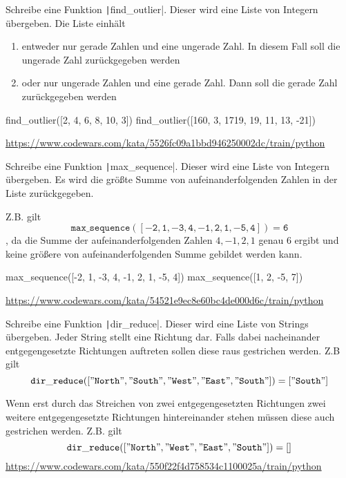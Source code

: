 \documentclass[class=scrartcl, crop=false]{standalone}
\begin{document}
\begin{aufgabe}
Schreibe eine Funktion \texttt|find_outlier|. Dieser wird eine Liste von Integern übergeben. Die Liste einhält \begin{enumerate}
\item entweder nur gerade Zahlen und eine ungerade Zahl. In diesem Fall soll die  ungerade Zahl zurückgegeben werden
\item oder nur ungerade Zahlen und eine gerade Zahl. Dann soll die  gerade Zahl zurückgegeben werden
\end{enumerate}

\begin{pyconsole}
find_outlier([2, 4, 6, 8, 10, 3])
find_outlier([160, 3, 1719, 19, 11, 13, -21])
\end{pyconsole}


\url{https://www.codewars.com/kata/5526fc09a1bbd946250002dc/train/python}
\end{aufgabe}



\begin{aufgabe}
Schreibe eine Funktion \texttt|max_sequence|. Dieser wird eine Liste von Integern übergeben. Es wird die größte Summe von aufeinanderfolgenden Zahlen in der Liste zurückgegeben.

Z.B. gilt $$\mathtt{max\_sequence([-2, 1, -3, 4, -1, 2, 1, -5, 4]) = 6}$$, da die Summe der aufeinanderfolgenden Zahlen $4, -1, 2, 1$ genau $6$ ergibt und keine größere von aufeinanderfolgenden Summe gebildet werden kann.



\begin{pyconsole}
max_sequence([-2, 1, -3, 4, -1, 2, 1, -5, 4])
max_sequence([1, 2, -5, 7])
\end{pyconsole}


\url{https://www.codewars.com/kata/54521e9ec8e60bc4de000d6c/train/python}
\end{aufgabe}

\begin{aufgabe}
Schreibe eine Funktion \texttt|dir_reduce|. Dieser wird eine Liste von Strings übergeben. Jeder String stellt eine Richtung dar.
Falls dabei nacheinander entgegengesetzte Richtungen auftreten sollen diese raus gestrichen werden. Z.B gilt $$\mathtt{dir\_reduce(["North", "South", "West", "East", "South"]) = ["South"] }$$

Wenn erst durch das Streichen von zwei entgegengesetzten Richtungen zwei weitere entgegengesetzte  Richtungen hintereinander stehen müssen diese auch gestrichen werden. Z.B. gilt
$$\mathtt{dir\_reduce(["North", "West", "East", "South"]) = [] }$$
\url{https://www.codewars.com/kata/550f22f4d758534c1100025a/train/python}

\end{aufgabe}
\end{document}
